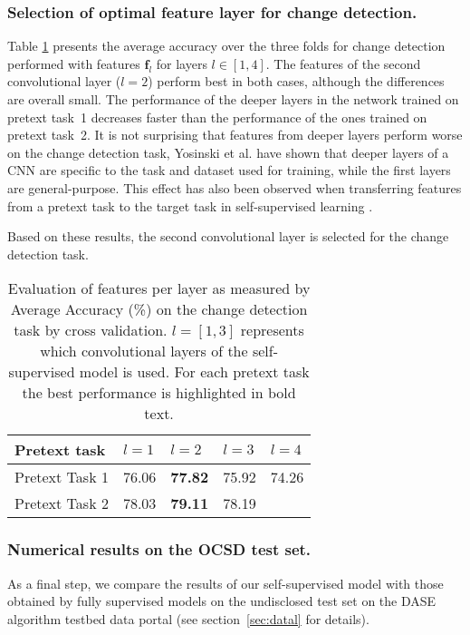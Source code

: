 \documentclass[runningheads]{llncs}
\begin{document}
\subsubsection{Selection of optimal feature layer for change detection.} 
Table \ref{tab:results_AA_layer_selection} presents the average accuracy  over the three folds for change detection performed with features $\mathbf{f}_l$ for layers $l \in [1,4]$. The features of the second convolutional layer ($l=2$) perform best in both cases, although the differences are overall small. The performance of the deeper layers in the network trained on pretext task~1 decreases faster than the performance of the ones trained on pretext task~2. It is not surprising that features from deeper layers perform worse on the change detection task, Yosinski et al. \cite{Yosinski:2014:transferring_features} have shown that deeper layers of a CNN are specific to the task and dataset used for training, while the first layers are general-purpose. This effect has also been observed when transferring features from a pretext task to the target task in self-supervised learning \cite{Kolesnikov:2019:self_supervised_comparison}.  

Based on these results, the second convolutional layer is selected for the change detection task.
\begin{table}[!t]
\caption[Evaluation of features per layer as measured by Average Accuracy on the change detection task.]{Evaluation of features per layer as measured by Average Accuracy (\%) on the change detection task by cross validation. $l = [1,3]$ represents which convolutional layers of the self-supervised model is used. 
For each pretext task the best performance is highlighted in bold text.}  
\centering
\begin{tabular}{l|l|l|l|l} \hline
Pretext task &  $l=1$ & $l=2$ & $l=3$ & $l=4$ \\
\hline\hline
Pretext Task 1 & 76.06 & \textbf{77.82} & 75.92 & 74.26 \\
Pretext Task 2 & 78.03 & \textbf{79.11} & 78.19 & \\
\hline
\end{tabular}
\label{tab:results_AA_layer_selection}
\end{table}

\subsubsection{Numerical results on the OCSD test set.} As a final step, we compare the results of our self-supervised model with those obtained by fully supervised models on the undisclosed test set on the DASE algorithm testbed data portal (see section~\ref{sec:datal} for details). 
\end{document}
